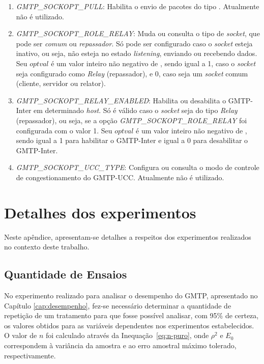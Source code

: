 \begin{apendicesenv}
\begin{enumerate}
	\item \textit{GMTP\_SOCKOPT\_PULL}: Habilita o envio de pacotes do tipo . Atualmente não é utilizado.
	
	\item \textit{GMTP\_SOCKOPT\_ROLE\_RELAY}: Muda ou consulta o tipo de \textit{socket}, que pode ser \textit{comum} ou \textit{repassador}. Só pode ser configurado caso o \textit{socket} esteja inativo, ou seja, não esteja no estado \textit{listening}, enviando ou recebendo dados.
	Seu $optval$ é um valor inteiro não negativo de , sendo igual a 1, caso o \textit{socket} seja configurado como \textit{Relay} (repassador), e 0, caso seja um \textit{socket} comum (cliente, servidor ou relator).
	
	\item \textit{GMTP\_SOCKOPT\_RELAY\_ENABLED}: Habilita ou desabilita o GMTP-Inter em determinado \textit{host}. Só é válido caso o \textit{socket} seja do tipo \textit{Relay} (repassador), ou seja, se a opção \textit{GMTP\_SOCKOPT\_ROLE\_RELAY} foi configurada com o valor 1.
	Seu $optval$ é um valor inteiro não negativo de , sendo igual a 1 para habilitar o GMTP-Inter e igual a 0 para desabilitar o GMTP-Inter.
	
	\item \textit{GMTP\_SOCKOPT\_UCC\_TYPE}: Configura ou consulta o modo de controle de congestionamento do GMTP-UCC. Atualmente não é utilizado. 
\end{enumerate}

\chapter{Detalhes dos experimentos}
\label{ap:experimentos}

Neste apêndice, apresentam-se detalhes a respeitos dos experimentos realizados no contexto deste trabalho.

\section{Quantidade de Ensaios}
\label{ap:ensaios}

No experimento realizado para analisar o desempenho do GMTP, apresentado no Capítulo \ref{cap:desempenho}, fez-se necessário determinar a quantidade de repetição de um tratamento para que fosse possível analisar, com 95\% de certeza, os valores obtidos para as variáveis dependentes nos experimentos estabelecidos.
O valor de $n$ foi calculado através da Inequação~\ref{eq:n-puro}, onde $\rho^2$ e $E_0$ correspondem à variância da amostra e ao erro amostral máximo tolerado, respectivamente.


\end{apendicesenv}
